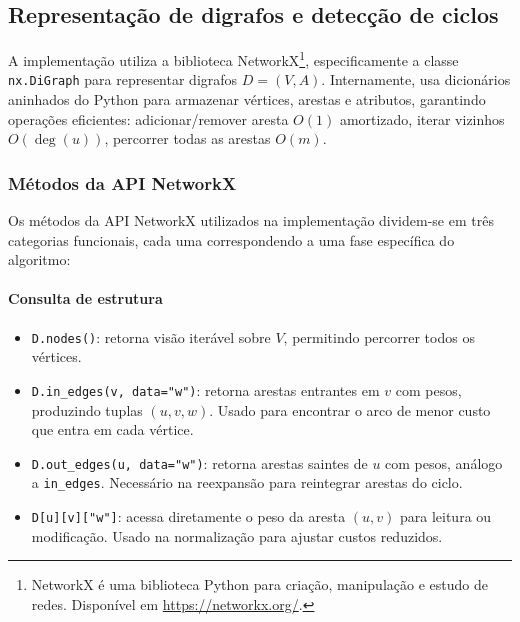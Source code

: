 \subsection{Representação de digrafos e detecção de ciclos}

A implementação utiliza a biblioteca NetworkX\footnote{NetworkX é uma biblioteca Python para criação, manipulação e estudo de redes. Disponível em \url{https://networkx.org/}.}, especificamente a classe \texttt{nx.DiGraph} para representar digrafos \(D=(V,A)\). Internamente, usa dicionários aninhados do Python para armazenar vértices, arestas e atributos, garantindo operações eficientes: adicionar/remover aresta \(O(1)\) amortizado, iterar vizinhos \(O(\deg(u))\), percorrer todas as arestas \(O(m)\).

\subsubsection*{Métodos da API NetworkX}

Os métodos da API NetworkX utilizados na implementação dividem-se em três categorias funcionais, cada uma correspondendo a uma fase específica do algoritmo:

\paragraph*{Consulta de estrutura}
\begin{itemize}\setlength{\itemsep}{2pt}
    \item \texttt{D.nodes()}: retorna visão iterável sobre \(V\), permitindo percorrer todos os vértices.
    \item \texttt{D.in\_edges(v, data="w")}: retorna arestas entrantes em \(v\) com pesos, produzindo tuplas \((u, v, w)\). Usado para encontrar o arco de menor custo que entra em cada vértice.
    \item \texttt{D.out\_edges(u, data="w")}: retorna arestas saintes de \(u\) com pesos, análogo a \texttt{in\_edges}. Necessário na reexpansão para reintegrar arestas do ciclo.
    \item \texttt{D[u][v]["w"]}: acessa diretamente o peso da aresta \((u,v)\) para leitura ou modificação. Usado na normalização para ajustar custos reduzidos.
\end{itemize}

